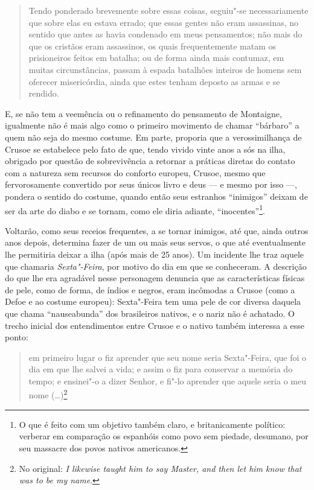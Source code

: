 \begin{quote}
Tendo ponderado brevemente sobre essas coisas, seguiu"-se necessariamente
que sobre elas eu estava errado; que essas gentes não eram assassinas,
no sentido que antes as havia condenado em meus pensamentos; não mais do
que os cristãos eram assassinos, os quais frequentemente matam os
prisioneiros feitos em batalha; ou de forma ainda mais contumaz, em
muitas circunstâncias, passam à espada batalhões inteiros de homens sem
oferecer misericórdia, ainda que estes tenham deposto as armas e se
rendido.
\end{quote}

E, se não tem a veemência ou o refinamento do pensamento de Montaigne,
igualmente não é mais algo como o primeiro movimento de chamar
``bárbaro'' a quem não seja do mesmo costume. Em parte, proporia que a
verossimilhança de Crusoe se estabelece pelo fato de que, tendo vivido
vinte anos a sós na ilha, obrigado por questão de sobrevivência a
retornar a práticas diretas do contato com a natureza sem recursos do
conforto europeu, Crusoe, mesmo que fervorosamente convertido por seus
únicos livro e deus --- e mesmo por isso ---, pondera o sentido do
costume, quando então seus estranhos ``inimigos'' deixam de ser da arte
do diabo e se tornam, como ele diria adiante, ``inocentes''\footnote{O
  que é feito com um objetivo também claro, e britanicamente político:
  verberar em comparação os espanhóis como povo sem piedade, desumano,
  por seu massacre dos povos nativos americanos.}.

Voltarão, como seus receios frequentes, a se tornar inimigos, até que,
ainda outros anos depois, determina fazer de um ou mais seus servos, o
que até eventualmente lhe permitiria deixar a ilha (após mais de 25
anos). Um incidente lhe traz aquele que chamaria \emph{Sexta"-Feira}, por
motivo do dia em que se conheceram. A descrição do que lhe era agradável
nesse personagem denuncia que as características físicas de pele, como
de forma, de índios e negros, eram incômodas a Crusoe (como a Defoe e ao
costume europeu): Sexta"-Feira tem uma pele de cor diversa daquela que
chama ``nauseabunda'' dos brasileiros nativos, e o nariz não é achatado.
O trecho inicial dos entendimentos entre Crusoe e o nativo também
interessa a esse ponto:

\begin{quote}
em primeiro lugar o fiz aprender que seu nome seria Sexta"-Feira, que foi
o dia em que lhe salvei a vida; e assim o fiz para conservar a memória
do tempo; e ensinei"-o a dizer Senhor, e fi"-lo aprender que aquele seria
o meu nome (\ldots{})\footnote{No original: \emph{I likewise taught him to
  say Master, and then let him know that was to be my name}.}
\end{quote}


